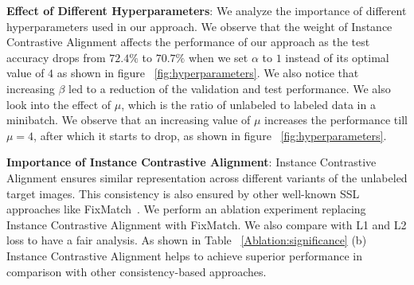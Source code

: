\begin{table}
\renewcommand{\arraystretch}{1.2}
    \centering
{}
\caption{Experiments to understand the significance of individual components of our framework. }
\label{Ablation:significance}
\end{table}


\noindent\textbf{Effect of Different Hyperparameters}: We analyze the importance of different hyperparameters used in our approach. We observe that the weight of Instance Contrastive Alignment affects the performance of our approach as the test accuracy drops from $ 72.4\%$ to $70.7\%$ when we set $\alpha$ to $1$ instead of its optimal value of $4$ as shown in figure ~\ref{fig:hyperparameters}. We also notice that increasing $\beta$ led to a reduction of the validation and test performance. We also look into the effect of $\mu$, which is the ratio of unlabeled to labeled data in a minibatch. We observe that an increasing value of $\mu$ increases the performance till $\mu=4$, after which it starts to drop, as shown in figure ~\ref{fig:hyperparameters}.

\noindent \textbf{Importance of Instance Contrastive Alignment}: Instance Contrastive Alignment ensures similar representation across different variants of the unlabeled target images. This consistency is also ensured by other well-known SSL approaches like  FixMatch~\cite{Sohn2020FixMatchSS}. We perform an ablation experiment replacing Instance Contrastive Alignment with FixMatch. We also compare with L1 and L2 loss to have a fair analysis. As shown in Table ~\ref{Ablation:significance} (b) Instance Contrastive Alignment helps to achieve superior performance in comparison with other consistency-based approaches. 

